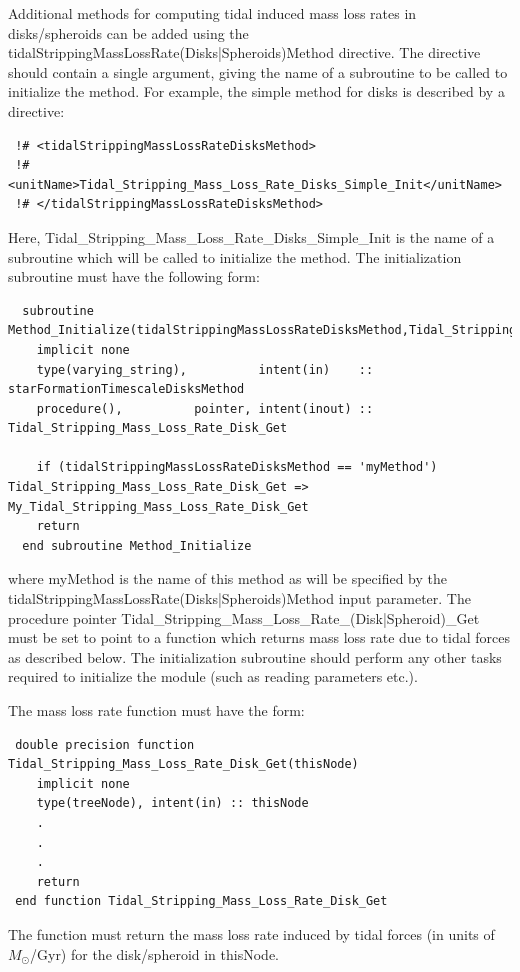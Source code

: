 Additional methods for computing tidal induced mass loss rates in disks/spheroids can be added using the {\normalfont \ttfamily tidalStrippingMassLossRate(Disks|Spheroids)Method} directive. The directive should contain a single argument, giving the name of a subroutine to be called to initialize the method. For example, the {\normalfont \ttfamily simple} method for disks is described by a directive:
\begin{verbatim}
 !# <tidalStrippingMassLossRateDisksMethod>
 !#  <unitName>Tidal_Stripping_Mass_Loss_Rate_Disks_Simple_Init</unitName>
 !# </tidalStrippingMassLossRateDisksMethod>
\end{verbatim}
Here, {\normalfont \ttfamily Tidal\_Stripping\_Mass\_Loss\_Rate\_Disks\_Simple\_Init} is the name of a subroutine which will be called to initialize the method. The initialization subroutine must have the following form:
\begin{verbatim}
  subroutine Method_Initialize(tidalStrippingMassLossRateDisksMethod,Tidal_Stripping_Mass_Loss_Rate_Disk_Get)
    implicit none
    type(varying_string),          intent(in)    :: starFormationTimescaleDisksMethod
    procedure(),          pointer, intent(inout) :: Tidal_Stripping_Mass_Loss_Rate_Disk_Get
    
    if (tidalStrippingMassLossRateDisksMethod == 'myMethod') Tidal_Stripping_Mass_Loss_Rate_Disk_Get => My_Tidal_Stripping_Mass_Loss_Rate_Disk_Get
    return
  end subroutine Method_Initialize
\end{verbatim}
where {\normalfont \ttfamily myMethod} is the name of this method as will be specified by the {\normalfont \ttfamily tidalStrippingMassLossRate(Disks|Spheroids)Method} input parameter. The procedure pointer {\normalfont \ttfamily Tidal\_Stripping\_Mass\_Loss\_Rate\_(Disk|Spheroid)\_Get} must be set to point to a function which returns mass loss rate due to tidal forces as described below. The initialization subroutine should perform any other tasks required to initialize the module (such as reading parameters etc.).

The mass loss rate function must have the form:
\begin{verbatim}
 double precision function Tidal_Stripping_Mass_Loss_Rate_Disk_Get(thisNode)
    implicit none
    type(treeNode), intent(in) :: thisNode
    .
    .
    .
    return
 end function Tidal_Stripping_Mass_Loss_Rate_Disk_Get
\end{verbatim}
The function must return the mass loss rate induced by tidal forces (in units of $M_\odot$/Gyr) for the disk/spheroid in {\normalfont \ttfamily thisNode}.

